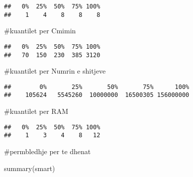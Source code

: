 \documentclass[
]{article}
\newenvironment{Shaded}{\begin{snugshade}}{\end{snugshade}}
\newcommand{\FunctionTok}[1]{\textcolor[rgb]{0.00,0.00,0.00}{#1}}
\newcommand{\NormalTok}[1]{#1}
\newcommand{\SpecialCharTok}[1]{\textcolor[rgb]{0.00,0.00,0.00}{#1}}
\begin{document}
\begin{verbatim}
##   0%  25%  50%  75% 100% 
##    1    4    8    8    8
\end{verbatim}

\#kuantilet per Cmimin

\begin{Shaded}
\end{Shaded}

\begin{verbatim}
##   0%  25%  50%  75% 100% 
##   70  150  230  385 3120
\end{verbatim}

\#kuantilet per Numrin e shitjeve

\begin{Shaded}
\end{Shaded}

\begin{verbatim}
##        0%       25%       50%       75%      100% 
##    105624   5545260  10000000  16500305 156000000
\end{verbatim}

\#kuantilet per RAM

\begin{Shaded}
\end{Shaded}

\begin{verbatim}
##   0%  25%  50%  75% 100% 
##    1    3    4    8   12
\end{verbatim}

\#permbledhje per te dhenat

\begin{Shaded}
\begin{Highlighting}[]
\FunctionTok{summary}\NormalTok{(smart)}
\end{Highlighting}
\end{Shaded}
\end{document}
